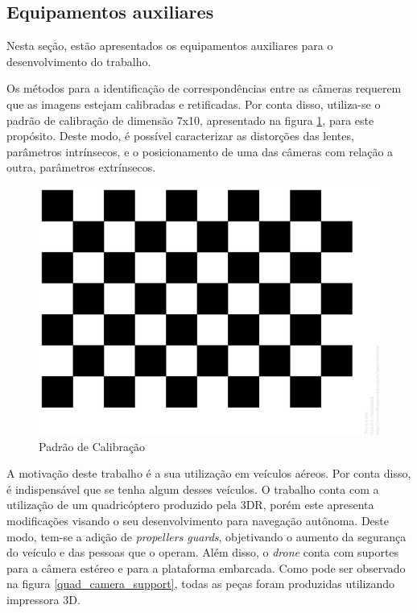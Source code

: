 \subsection{Equipamentos auxiliares}

Nesta seção, estão apresentados os equipamentos auxiliares para o desenvolvimento do trabalho. 

Os métodos para a identificação de correspondências entre as câmeras requerem que as imagens estejam calibradas e retificadas. Por conta disso, utiliza-se o padrão de calibração de dimensão 7x10, apresentado na figura \ref{calibration_pattern}, para este propósito. Deste modo, é possível caracterizar as distorções das lentes, parâmetros intrínsecos, e o posicionamento de uma das câmeras com relação a outra, parâmetros extrínsecos.  

\begin{figure}[H]
	\centering
	\includegraphics[scale=0.10]{./Resources/calibration_pattern.png}
	\caption{Padrão de Calibração}
	\label{calibration_pattern}
\end{figure}

A motivação deste trabalho é a sua utilização em veículos aéreos. Por conta disso, é indispensável que se tenha algum desses veículos. O trabalho conta com a utilização de um quadricóptero produzido pela 3DR, porém este apresenta modificações visando o seu desenvolvimento para navegação autônoma. Deste modo, tem-se a adição de \textit{propellers guards}, objetivando o aumento da segurança do veículo e das pessoas que o operam. Além disso, o \textit{drone} conta com suportes para a câmera estéreo e para a plataforma embarcada. Como pode ser observado na figura \ref{quad_camera_support}, todas as peças foram produzidas utilizando impressora 3D.

